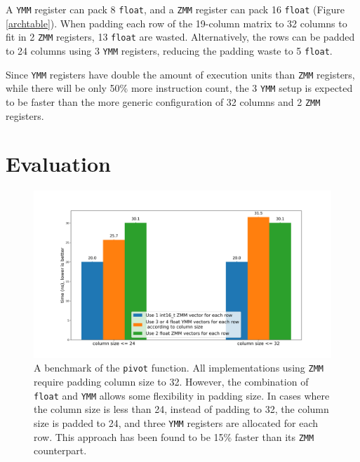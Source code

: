 \documentclass[logo,bsc,singlespacing,parskip]{infthesis}
\newcommand{\dtfloat}{\texttt{float}}
\newcommand{\pivot}{\texttt{pivot}}
\newcommand{\ymm}{\texttt{YMM}}
\newcommand{\zmm}{\texttt{ZMM}}
\begin{document}
A \ymm{} register can pack 8 \dtfloat{}, and a \zmm{}
register can pack 16 \dtfloat{} (Figure \ref{archtable}). When padding each row
of the 19-column matrix to 32 columns to fit in 2 \zmm{} registers, 13 \dtfloat{}
are wasted. Alternatively, the rows can be padded to 24 columns using 3 \ymm{}
registers, reducing the padding waste to 5 \dtfloat{}.

Since \ymm{} registers have double the amount of execution units than \zmm{}
registers, while there will be only 50\% more instruction count, the 3 \ymm{}
setup is expected to be faster than the more generic configuration of 32 columns
and 2 \zmm{} registers. 


\section{Evaluation}
\begin{figure}[H]
    \begin{center}
        \includegraphics[width=\linewidth]{image/specialize-i16-f32-v2.png}
    \end{center}
    \caption{ A benchmark of the \pivot{} function.
    All implementations using \zmm{} require padding column size to 32.
    However, the combination of \dtfloat{} and \ymm{} allows some flexibility
    in padding size. 
    In cases where the column size is less than 24, instead of padding to 32, 
    the column size is padded to 24, and three \ymm{} registers are allocated for each row.
    This approach has been found to be 15\% faster than its \zmm{} counterpart.
    }
    \label{fig:specialization}
\end{figure}
\end{document}
